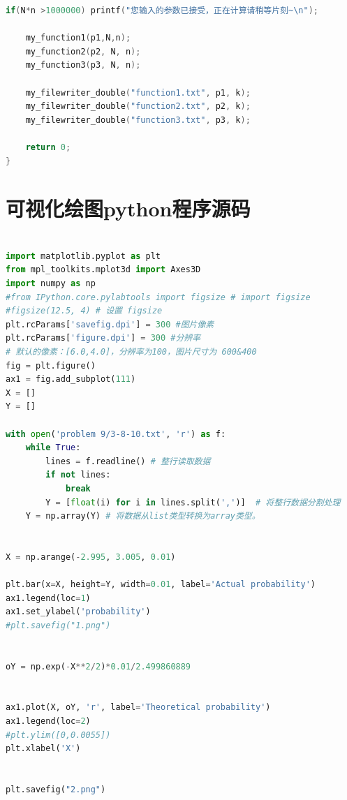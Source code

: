 \documentclass[a4paper,11pt]{article}
\begin{document}
\begin{appendices}
\begin{lstlisting}[language = C]
    if(N*n >1000000) printf("您输入的参数已接受，正在计算请稍等片刻~\n");
    
    my_function1(p1,N,n);
    my_function2(p2, N, n);
    my_function3(p3, N, n);
    
    my_filewriter_double("function1.txt", p1, k);
    my_filewriter_double("function2.txt", p2, k);
    my_filewriter_double("function3.txt", p3, k);
    
    return 0;
}

\end{lstlisting}

\newpage

\section{可视化绘图python程序源码}

\begin{lstlisting}[language = python]

import matplotlib.pyplot as plt
from mpl_toolkits.mplot3d import Axes3D
import numpy as np
#from IPython.core.pylabtools import figsize # import figsize
#figsize(12.5, 4) # 设置 figsize
plt.rcParams['savefig.dpi'] = 300 #图片像素
plt.rcParams['figure.dpi'] = 300 #分辨率
# 默认的像素：[6.0,4.0]，分辨率为100，图片尺寸为 600&400
fig = plt.figure()
ax1 = fig.add_subplot(111)
X = []
Y = []

with open('problem 9/3-8-10.txt', 'r') as f:
    while True:
        lines = f.readline() # 整行读取数据
        if not lines:
            break
        Y = [float(i) for i in lines.split(',')]  # 将整行数据分割处理
    Y = np.array(Y) # 将数据从list类型转换为array类型。


X = np.arange(-2.995, 3.005, 0.01)

plt.bar(x=X, height=Y, width=0.01, label='Actual probability')
ax1.legend(loc=1)
ax1.set_ylabel('probability')
#plt.savefig("1.png")


oY = np.exp(-X**2/2)*0.01/2.499860889


ax1.plot(X, oY, 'r', label='Theoretical probability')
ax1.legend(loc=2)
#plt.ylim([0,0.0055])
plt.xlabel('X')


plt.savefig("2.png")


\end{lstlisting}


\end{appendices}
\end{document}
